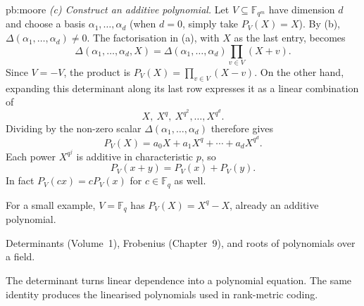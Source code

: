 \begin{solution}{pb:moore}
\emph{(c) Construct an additive polynomial.}
Let $V\subseteq\mathbb F_{q^m}$ have dimension $d$ and choose a basis $\alpha_1,\ldots,\alpha_d$ (when $d=0$, simply take $P_V(X)=X$). By (b), $\Delta(\alpha_1,\ldots,\alpha_d)\ne0$. The factorisation in (a), with $X$ as the last entry, becomes
\[
\Delta(\alpha_1,\ldots,\alpha_d,X)
=\Delta(\alpha_1,\ldots,\alpha_d)\prod_{v\in V}(X+v).
\]
Since $V=-V$, the product is $P_V(X)=\prod_{v\in V}(X-v)$. On the other hand, expanding this determinant along its last row expresses it as a linear combination of
\[
X,\ X^q,\ X^{q^2},\ldots,X^{q^d}.
\]
Dividing by the non-zero scalar $\Delta(\alpha_1,\ldots,\alpha_d)$ therefore gives
\[
P_V(X)=a_0X+a_1X^q+\cdots+a_dX^{q^d}.
\]
Each power $X^{q^j}$ is additive in characteristic $p$, so
\[
\boxed{P_V(x+y)=P_V(x)+P_V(y).}
\]
In fact $P_V(cx)=cP_V(x)$ for $c\in\mathbb F_q$ as well.

For a small example, $V=\mathbb F_q$ has $P_V(X)=X^q-X$, already an additive polynomial.

\tools Determinants (Volume~1), Frobenius (Chapter~9), and roots of polynomials over a field.

\leads The determinant turns linear dependence into a polynomial equation. The same identity produces the linearised polynomials used in rank-metric coding.
\end{solution}

